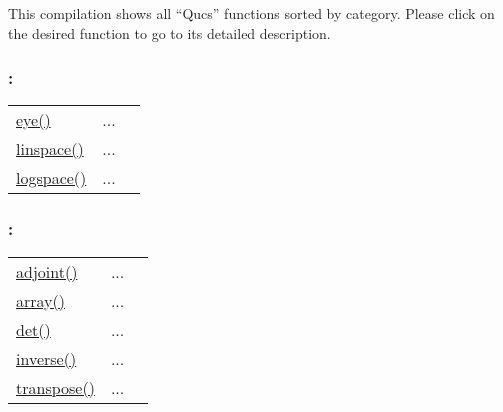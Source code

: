 
This compilation shows all {}``Qucs'' functions sorted by category.
Please click on the desired function to go to its detailed description.




\subsubsection*{: }

\textcolor{blue}{}\begin{tabular}{>{\raggedleft}p{3cm}>{\centering}p{0.5cm}l}
\textcolor{blue}{\hyperlink{eye}{eye()}}&
...&
 \begin{NoHyper} \nameref{par:identity} \end{NoHyper}\tabularnewline
\textcolor{blue}{\hyperlink{linspace}{linspace()}}&
...&
 \begin{NoHyper} \nameref{par:linspace} \end{NoHyper}\tabularnewline
\textcolor{blue}{\hyperlink{logspace}{logspace()}}&
...&
 \begin{NoHyper} \nameref{par:logspace} \end{NoHyper}\tabularnewline
\end{tabular}


\subsubsection*{: }

\textcolor{blue}{}\begin{tabular}{>{\raggedleft}p{3cm}>{\centering}p{0.5cm}l}
\textcolor{blue}{\hyperlink{adjoint}{adjoint()}}&
...&
 \begin{NoHyper} \nameref{par:Adjoint-matrix.} \end{NoHyper}\tabularnewline
\textcolor{blue}{\hyperlink{array}{array()}}&
...&
 \begin{NoHyper} \nameref{par:array} \end{NoHyper}\tabularnewline
\textcolor{blue}{\hyperlink{det}{det()}}&
...&
 \begin{NoHyper} \nameref{par:Determinant} \end{NoHyper}\tabularnewline
\textcolor{blue}{\hyperlink{inverse}{inverse()}}&
...&
 \begin{NoHyper} \nameref{par:Matrix-inverse} \end{NoHyper}\tabularnewline
\textcolor{blue}{\hyperlink{transpose}{transpose()}}&
...&
 \begin{NoHyper} \nameref{par:Matrix-transpose} \end{NoHyper}\tabularnewline
\end{tabular}


